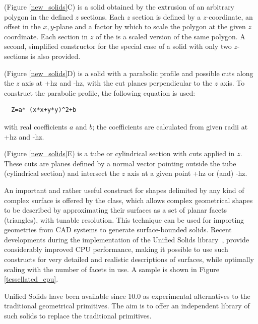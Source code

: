  (Figure \ref{new_solids}C) is a solid obtained by the
extrusion of an arbitrary polygon in the defined $z$ sections.  Each $z$ section
is defined by a $z$-coordinate, an offset in the $x,y$-plane and a factor by
which to scale the polygon at the given $z$ coordinate.  Each section in $z$ of
the  is a scaled version of the same polygon.  A second,
simplified constructor for the special case of a solid with only two
$z$-sections is also provided.

 (Figure \ref{new_solids}D) is a solid with a parabolic
profile and possible cuts along the $z$ axis at +hz and -hz, with the cut planes 
perpendicular to the $z$ axis.  To construct the parabolic profile, the 
following equation is used:
\begin{verbatim}
  Z=a* (x*x+y*y)^2+b
\end{verbatim}
with real coefficients $a$ and $b$; the coefficients are calculated from given
radii at +hz and -hz.

 (Figure \ref{new_solids}E) is a tube or cylindrical section
with cuts applied in $z$.  These cuts are planes defined by a normal vector 
pointing outside the tube (cylindrical section) and intersect the $z$ axis at a
given point +hz or (and) -hz.

An important and rather useful construct for shapes delimited by any kind of 
complex surface is offered by the  class, which allows
complex geometrical shapes to be described by approximating their surfaces as a
set of planar facets (triangles), with tunable resolution.  This technique can
be used for importing geometries from CAD systems to generate surface-bounded 
solids.  Recent developments during the implementation of the Unified Solids
library~\cite{detmodeling:USolids}, provide considerably improved CPU 
performance, making it possible to use such constructs for very detailed and 
realistic descriptions of surfaces, while optimally scaling with the number of 
facets in use.  A sample  is shown in 
Figure \ref{tessellated_cpu}.
 
Unified Solids have been available since \Gfour{} 10.0 as experimental 
alternatives to the traditional geometrical primitives.  The aim is to offer
an independent library of such solids to replace the traditional primitives.

